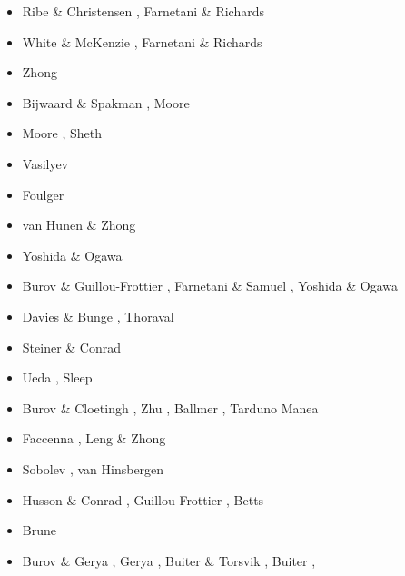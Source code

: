 \begin{scriptsize}
\begin{itemize}
\item[\nineteenninetyfour] Ribe \& Christensen \cite{rich94}, Farnetani \& Richards \cite{fari94}
\item[\nineteenninetyfive] White \& McKenzie \cite{whmc95}, Farnetani \& Richards \cite{fari95}
\item[\nineteenninetysix] Zhong \etal \cite{zhgm96}
\item[\nineteenninetyeight] Bijwaard \& Spakman \cite{bisp98}, Moore \etal \cite{most98}
\item[\nineteenninetynine] Moore \etal \cite{most99}, Sheth \cite{shet99}
\item[\twothousandone] Vasilyev \etal \cite{vapy01}
\item[\twothousandtwo] Foulger \cite{foul02}
\item[\twothousandthree] van Hunen \& Zhong \cite{vazh03}
\item[\twothousandfour] Yoshida \& Ogawa \cite{yoog04}
\item[\twothousandfive] Burov \& Guillou-Frottier \cite{bugu05}, Farnetani \& Samuel \cite{fasa05}, 
                        Yoshida \& Ogawa \cite{yoog05}
\item[\twothousandsix] Davies \& Bunge \cite{dabu06}, Thoraval \etal \cite{thtd06}
\item[\twothousandseven] Steiner \& Conrad \cite{stco07}
\item[\twothousandeight] Ueda \etal \cite{uegs08}, Sleep \cite{slee08}
\item[\twothousandnine] Burov \& Cloetingh \cite{bucl09}, Zhu \etal \cite{zhgy09},
                        Ballmer \etal \cite{baiv10}, Tarduno \etal \cite{tabs09}
                        Manea \etal \cite{maml09}
\item[\twothousandten] Faccenna \etal \cite{fabl10}, Leng \& Zhong \cite{lezh10}
\item[\twothousandeleven] Sobolev \etal \cite{sosk11}, van Hinsbergen \etal \cite{vasd11}
\item[\twothousandtwelve] Husson \& Conrad \cite{huco12}, Guillou-Frottier \etal \cite{gubc12},
                          Betts \etal \cite{bemm12}
\item[\twothousandthirteen] Brune \etal \cite{brps13}
\item[\twothousandfourteen] Burov \& Gerya \cite{buge14}, Gerya \cite{gery14b},
                            Buiter \& Torsvik \cite{buto14}, Buiter \cite{buit14},

\end{itemize}
\end{scriptsize}
